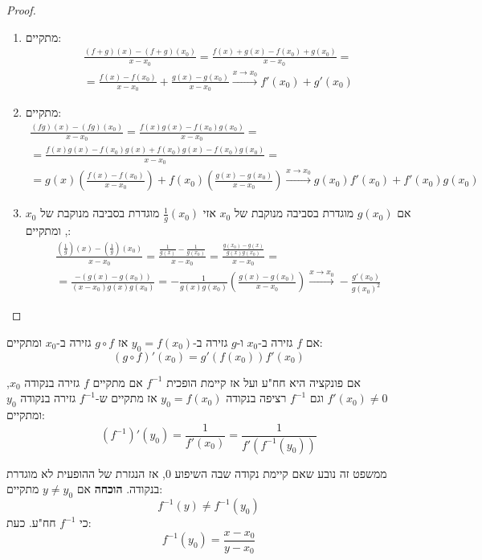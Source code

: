 \documentclass{tstextbook}
\begin{document}
\begin{proof}
  \begin{enumerate}
    \item מתקיים: 
$$\begin{gather}\frac{(f+g)(x)-(f+g)(x_{0})}{x-x_{0}}= \frac{f(x)+g(x)-f(x_{0})+g(x_{0})}{x-x_{0}}=  \\=\frac{f(x)-f(x_{0})}{x-x_{0}}+ \frac{g(x)-g(x_{0})}{x-x_{0}}\xrightarrow{x\to x_{0}}f'(x_{0})+g'(x_{0})
\end{gather}$$


    \item מתקיים: 
$$\begin{gather}\frac{(fg)(x)-(fg)(x_{0})}{x-x_{0}}=\frac{f(x)g(x)-f(x_{0})g(x_{0})}{x-x_{0}}=  \\=\frac{f(x)g(x)-f(x_{0})g(x)+f(x_{0})g(x)-f(x_{0})g(x_{0})}{x-x_{0}}= \\=g(x)\left( \frac{f(x)-f(x_{0})}{x-x_{0}} \right)+f(x_{0})\left( \frac{g(x)-g(x_{0})}{x-x_{0}} \right)\xrightarrow{x\to x_{0}} g(x_{0})f'(x_{0})+ f'(x_{0})g(x_{0})
\end{gather}$$


    \item אם \(g(x_{0})\) מוגדרת בסביבה מנוקבת של \(x_{0}\) אזי \(\frac{1}{g}(x_{0})\) מוגדרת בסביבה מנוקבת של \(x_{0}\), ומתקיים: 
$$\begin{gather}\frac{\left( \frac{1}{g} \right)(x)-\left( \frac{1}{g} \right)(x_{0})}{x-x_{0}}= \frac{\frac{1}{g(x)}-\frac{1}{g(x_{0})}}{x-x_{0}}=\frac{\frac{g(x_{0})-g(x)}{g(x)g(x_{0})}}{x-x_{0}}=  \\=\frac{-(g(x)-g(x_{0}))}{(x-x_{0})g(x)g(x_{0})}=-\frac{1}{g(x)g(x_{0})}\left( \frac{g(x)-g(x_{0})}{x-x_{0}} \right)\xrightarrow{x\to x_{0}} -\frac{g'(x_{0})}{g(x_{0})^{2}}
\end{gather}$$


  \end{enumerate}
\end{proof}
\begin{theorem}
אם \(f\) גזירה ב-\(x_{0}\) ו-\(g\) גזירה ב-\(y_{0}=f(x_{0})\) אז \(g\circ f\) גזירה ב-\(x_{0}\) ומתקיים:
$$\left( g\circ f \right)'(x_{0})=g'(f(x_{0}))f'(x_{0})$$

\end{theorem}
\begin{theorem}
אם פונקציה היא חח"ע ועל אז קיימת הופכית \(f^{-1}\)
אם מתקיים \(f\) גזירה בנקודה \(x_0\), \(f'(x_0) \neq 0\) וגם \(f^{-1}\) רציפה בנקודה \(y_0=f(x_0)\) אז מתקיים ש-\(f^{-1}\) גזירה בנקודה \(y_0\) ומתקיים:
$$(f^{-1})'(y_0) = \frac{1}{f'(x_0)}=\frac{1}{f'(f^{-1} (y_0))}$$

\end{theorem}
ממשפט זה נובע שאם קיימת נקודה שבה השיפוע 0, אז הנגזרת של ההופעית לא מוגדרת בנקודה.
\textbf{הוכחה}
אם \(y\neq y_{0}\) מתקיים:
$$f^{-1}(y)\neq f^{-1}(y_{0})$$
כי \(f^{-1}\) חח"ע. כעת:
$$f^{-1}(y_{0})=\frac{x-x_{0}}{y-x_{0}}$$
\end{document}
